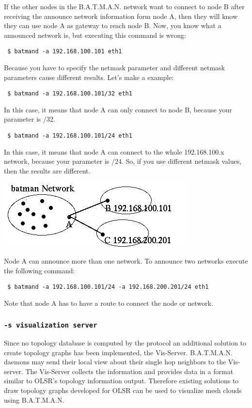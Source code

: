 \documentclass[
	12pt,
	a4paper,
	twoside,
	english,
	headsepline,
	footnosepline,
	automark,
	normalheadings,
	openany,
	cleardoubleplain,
	abstracton,
	idxtotoc,
	liststotoc,
	bibtotoc,
 	BCOR8mm,
]{scrartcl}
\newcommand{\subsubsectionttt}[1]{\subsubsection{\texttt{#1}}}
\begin{document}
If the other nodes in the B.A.T.M.A.N. network want to connect to node B after receiving the  announce network information form node A, then they will know they can use node A as  gateway to reach node B. Now, you know what a announced network is, but executing this command is wrong: 
\begin{verbatim}
 $ batmand -a 192.168.100.101 eth1
\end{verbatim}

Because you have to specify the netmask parameter and different netmask parameters cause  different results. Let's make a example:
\begin{verbatim}
 $ batmand -a 192.168.100.101/32 eth1
\end{verbatim}
In this case, it means that node A can only connect to node B, because your parameter is /32.

\begin{verbatim}
 $ batmand -a 192.168.100.101/24 eth1
\end{verbatim}
In this case, it means that node A can connect to the whole 192.168.100.x network, because  your parameter is /24. So, if you use different netmask values, then the results are different.

\begin{center}
\includegraphics[scale=0.8]{multiple_announces}
\end{center}

Node A can  announce more than one network. To announce two networks execute the following  command:
\begin{verbatim}
 $ batmand -a 192.168.100.101/24 -a 192.168.200.201/24 eth1
\end{verbatim}
Note that node A has to have a route to connect the node or network.

\subsubsectionttt{-s visualization server}
Since no topology database is computed by the protocol an additional solution to create  topology graphs has been implemented, the Vis-Server. B.A.T.M.A.N. daemons may send their  local view about their single hop neighbors to the Vis-server. The Vis-Server collects the  information and provides data in a format similar to OLSR's topology information output.  Therefore existing solutions to draw topology graphs developed for OLSR can be used to  visualize mesh clouds using B.A.T.M.A.N.
\end{document}
